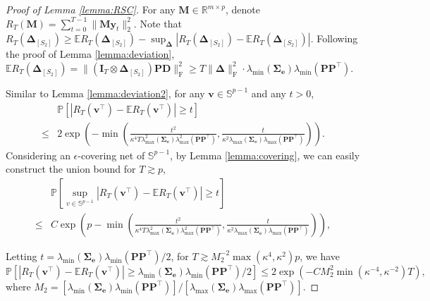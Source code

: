 \documentclass[12pt]{article}
\newcommand{\bm}{\boldsymbol}
\begin{document}
\begin{proof}[Proof of Lemma \ref{lemma:RSC}]
	For any $\bm{M}\in\mathbb{R}^{m\times p}$, denote $R_T(\bm{M})=\sum_{t=0}^{T-1}\|\bm{M}\bm{y}_t\|_2^2$. Note that $R_T(\bm{\Delta}_{[S_2]})\geq\mathbb{E}R_T(\bm{\Delta}_{[S_2]})-\sup_{\bm{\Delta}}|R_T(\bm{\Delta}_{[S_2]})-\mathbb{E}R_T(\bm{\Delta}_{[S_2]})|$. 	Following the proof of Lemma \ref{lemma:deviation}, $\mathbb{E}R_T(\bm{\Delta}_{[S_2]})=\|(\bm{I}_T\otimes\bm{\Delta}_{[S_2]})\bm{PD}\|_{\text{F}}^2\geq T\|\bm{\Delta}\|_{\text{F}}^2\cdot\lambda_{\min}(\bm{\Sigma_e})\lambda_{\min}(\bm{PP}^\top)$.
	
	Similar to Lemma \ref{lemma:deviation2}, for any $\bm{v}\in\mathbb{S}^{p-1}$ and any $t>0$,
	\begin{equation}
	\begin{split}
	&\mathbb{P}[|R_T(\bm{v}^\top)-\mathbb{E}R_T(\bm{v}^\top)|\geq t]\\
	\leq& 2\exp\left(-\min\left(\frac{t^2}{\kappa^4T\lambda_{\max}^2(\bm{\Sigma_e})\lambda_{\max}^2(\bm{P}\bm{P}^\top)},\frac{t}{\kappa^2\lambda_{\max}(\bm{\Sigma_e})\lambda_{\max}(\bm{P}\bm{P}^\top)}\right)\right).
	\end{split}
	\end{equation}
	Considering an $\epsilon$-covering net of $\mathbb{S}^{p-1}$, by Lemma \ref{lemma:covering}, we can easily construct the union bound for $T\gtrsim p$,
	\begin{equation}\begin{split}
	&\mathbb{P}\left[\sup_{v\in\mathbb{S}^{p-1}}|R_T(\bm{v}^\top)-\mathbb{E}R_T(\bm{v}^\top)|\geq t\right]\\
	\leq& C\exp\left(p-\min\left(\frac{t^2}{\kappa^4T\lambda_{\max}^2(\bm{\Sigma_e})\lambda_{\max}^2(\bm{P}\bm{P}^\top)},\frac{t}{\kappa^2\lambda_{\max}(\bm{\Sigma_e})\lambda_{\max}(\bm{P}\bm{P}^\top)}\right)\right),
	\end{split}\end{equation}
	
	Letting $t=\lambda_{\min}(\bm{\Sigma_e})\lambda_{\min}(\bm{PP}^\top)/2$, for $T\gtrsim M_2^{-2}\max(\kappa^4,\kappa^2)p$, we have
	\begin{equation}
	\mathbb{P}[|R_T(\bm{v}^\top)-\mathbb{E}R_T(\bm{v}^\top)|\geq \lambda_{\min}(\bm{\Sigma_e})\lambda_{\min}(\bm{PP}^\top)/2]\leq 2\exp(-CM_2^2\min(\kappa^{-4},\kappa^{-2})T),
	\end{equation}
	where $M_2=[\lambda_{\min}(\bm{\Sigma_e})\lambda_{\min}(\bm{PP}^\top)]/[\lambda_{\max}(\bm{\Sigma_e})\lambda_{\max}(\bm{PP}^\top)]$.
	

\end{proof}
\end{document}
